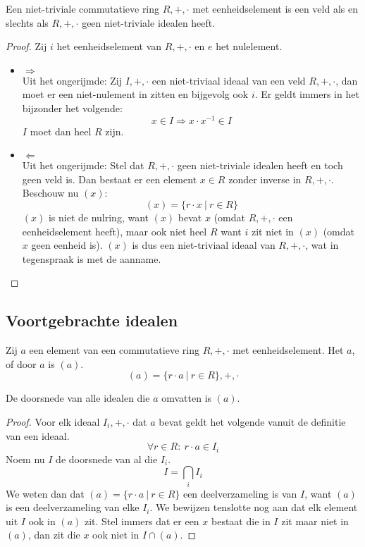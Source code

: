\documentclass[main.tex]{subfiles}
\begin{document}
\begin{st}
  Een niet-triviale commutatieve ring $R,+,\cdot$ met eenheidselement is een veld als en slechts als $R,+,\cdot$ geen niet-triviale idealen heeft.

  \begin{proof}
    Zij $i$ het eenheidselement van $R,+,\cdot$ en $e$ het nulelement.
    \begin{itemize}
    \item $\Rightarrow$\\
      Uit het ongerijmde:
      Zij $I,+,\cdot$ een niet-triviaal ideaal van een veld $R,+,\cdot$, dan moet er een niet-nulement in zitten en bijgevolg ook $i$.
      Er geldt immers in het bijzonder het volgende:
      \[ x \in I \Rightarrow x \cdot x^{-1} \in I \]
      $I$ moet dan heel $R$ zijn.
    \item $\Leftarrow$\\
      Uit het ongerijmde:
      Stel dat $R,+,\cdot$ geen niet-triviale idealen heeft en toch geen veld is.
      Dan bestaat er een element $x\in R$ zonder inverse in $R,+,\cdot$.
      Beschouw nu $(x)$:
      \[ (x) = \{ r\cdot x \ |\ r \in R \} \]
      $(x)$ is niet de nulring, want $(x)$ bevat $x$ (omdat $R,+,\cdot$ een eenheidselement heeft), maar ook niet heel $R$ want $i$ zit niet in $(x)$ (omdat $x$ geen eenheid is).
      $(x)$ is dus een niet-triviaal ideaal van $R,+,\cdot$, wat in tegenspraak is met de aanname.
    \end{itemize}
  \end{proof}
\end{st}

\subsection{Voortgebrachte idealen}

\begin{de}
  \label{de:hoofdideaal}
  Zij $a$ een element van een commutatieve ring $R,+,\cdot$ met eenheidselement.
  Het  $a$,  of  door $a$ is $(a)$.
  \[ (a) = \{r \cdot a \ |\ r \in R \},+,\cdot \]
\end{de}

\begin{st}
  De doorsnede van alle idealen die $a$ omvatten is $(a)$.

  \begin{proof}
    Voor elk ideaal $I_{i},+,\cdot$ dat $a$ bevat geldt het volgende vanuit de definitie van een ideaal.
    \[ \forall r\in R:\ r\cdot a \in I_{i}\]
    Noem nu $I$ de doorsnede van al die $I_{i}$.
    \[ I = \bigcap_{i}I_{i}\]
    We weten dan dat $(a) = \{r \cdot a \ |\ r \in R \}$ een deelverzameling is van $I$, want $(a)$ is een deelverzameling van elke $I_{i}$.
    We bewijzen tenslotte nog aan dat elk element uit $I$ ook in $(a)$ zit.
    Stel immers dat er een $x$ bestaat die in $I$ zit maar niet in $(a)$, dan zit die $x$ ook niet in $I \cap (a)$.
  \end{proof}
\end{st}
\end{document}
